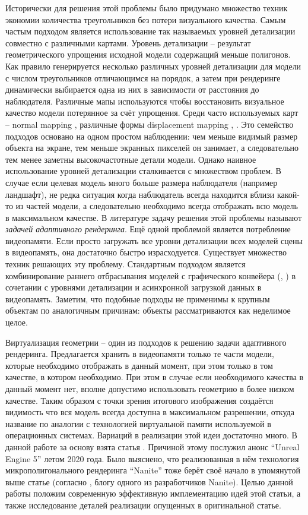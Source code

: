 \documentclass[12pt]{extarticle}
\begin{document}
Исторически для решения этой проблемы было придумано множество техник экономии количества треугольников без потери визуального качества. Самым частым подходом является использование так называемых уровней детализации совместно с различными картами. Уровень детализации -- результат геометрического упрощения исходной модели содержащий меньше полигонов. Как правило генерируется несколько различных уровней детализации для модели с числом треугольников отличающимся на порядок, а затем при рендеринге динамически выбирается одна из них в зависимости от расстояния до наблюдателя. Различные мапы используются чтобы восстановить визуальное качество модели потерянное за счёт упрощения. Среди часто используемых карт -- normal mapping \cite{normalmapping}, различные формы displacement mapping \cite{reliefmapping}, \cite{displacementmapping}. Это семейство подходов основано на одном простом наблюдении: чем меньше видимый размер объекта на экране, тем меньше экранных пикселей он занимает, а следовательно тем менее заметны высокочастотные детали модели. Однако наивное использование уровней детализации сталкивается с множеством проблем. В случае если целевая модель много больше размера наблюдателя (например ландшафт), не редка ситуация когда наблюдатель всегда находится вблизи какой-то из частей модели, а следовательно необходимо всегда отображать всю модель в максимальном качестве. В литературе задачу решения этой проблемы называют \emph{задачей адаптивного рендеринга}. Ещё одной проблемой является потребление видеопамяти. Если просто загружать все уровни детализации всех моделей сцены в видеопамять, она достаточно быстро израсходуется. Существует множество техник решающих эту проблему. Стандартным подходом является комбинирование раннего отбрасывания моделей с графического конвейера (\cite{frustum_culling}, \cite{coorg1997real}) в сочетании с уровнями детализации и асинхронной загрузкой данных в видеопамять. Заметим, что подобные подходы не применимы к крупным объектам по аналогичным причинам: объекты рассматриваются как неделимое целое.

Виртуализация геометрии -- один из подходов к решению задачи адаптивного рендеринга. Предлагается хранить в видеопамяти только те части модели, которые необходимо отображать в данный момент, при этом только в том качестве, в котором необходимо. При этом в случае если необходимого качества в данный момент нет, вполне допустимо использовать геометрию в более низком качестве. Таким образом с точки зрения итогового изображения создаётся видимость что вся модель всегда доступна в максимальном разрешении, откуда название по аналогии с технологией виртуальной памяти используемой в операционных системах. Вариаций в реализации этой идеи достаточно много. В данной работе за основу взята статья \cite{niski2007multi}. Причиной этому послужил анонс ``Unreal Engine 5'' \cite{ue5} летом 2020 года. Было выяснено, что реализованная в нём технология микрополигонального рендеринга ``Nanite'' тоже берёт своё начало в упомянутой выше статье (согласно \cite{graphicrants_vgi}, блогу одного из разработчиков Nanite). Целью данной работы положим современную эффективную имплементацию идей этой статьи, а также исследование деталей реализации опущенных в оригинальной статье.
\end{document}
